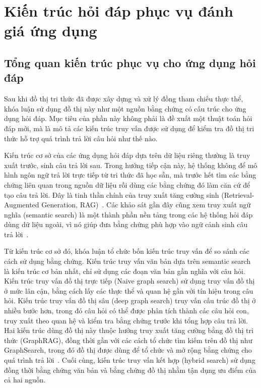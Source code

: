\section{Kiến trúc hỏi đáp phục vụ đánh giá ứng dụng}

\subsection{Tổng quan kiến trúc phục vụ cho ứng dụng hỏi đáp}

Sau khi đồ thị tri thức đã được xây dựng và xử lý đồng tham chiếu thực thể, khóa luận sử dụng đồ thị này như một nguồn bằng chứng có cấu trúc cho ứng dụng hỏi đáp. Mục tiêu của phần này không phải là đề xuất một thuật toán hỏi đáp mới, mà là mô tả các kiến trúc truy vấn được sử dụng để kiểm tra đồ thị tri thức hỗ trợ quá trình trả lời câu hỏi như thế nào.

Kiến trúc cơ sở của các ứng dụng hỏi đáp dựa trên dữ liệu riêng thường là truy xuất trước, sinh câu trả lời sau. Trong hướng tiếp cận này, hệ thống không để mô hình ngôn ngữ trả lời trực tiếp từ tri thức đã học sẵn, mà trước hết tìm các bằng chứng liên quan trong nguồn dữ liệu rồi dùng các bằng chứng đó làm căn cứ để tạo câu trả lời. Đây là tinh thần chính của truy xuất tăng cường sinh (Retrieval-Augmented Generation, RAG)~\cite{lewis2020retrieval}. Các khảo sát gần đây cũng xem truy xuất ngữ nghĩa (semantic search) là một thành phần nền tảng trong các hệ thống hỏi đáp dùng dữ liệu ngoài, vì nó giúp đưa bằng chứng phù hợp vào ngữ cảnh sinh câu trả lời~\cite{gao2023retrieval}.

Từ kiến trúc cơ sở đó, khóa luận tổ chức bốn kiến trúc truy vấn để so sánh các cách sử dụng bằng chứng. Kiến trúc truy vấn văn bản dựa trên semantic search là kiến trúc cơ bản nhất, chỉ sử dụng các đoạn văn bản gần nghĩa với câu hỏi. Kiến trúc truy vấn đồ thị trực tiếp (Naive graph search) sử dụng truy vấn đồ thị ở mức lân cận, bằng cách lấy các thực thể và quan hệ gần với tín hiệu trong câu hỏi. Kiến trúc truy vấn đồ thị sâu (deep graph search) truy vấn cấu trúc đồ thị ở nhiều bước hơn, trong đó câu hỏi có thể được phân tích thành các câu hỏi con, truy xuất theo quan hệ và kiểm tra bằng chứng trước khi tổng hợp câu trả lời. Hai kiến trúc dùng đồ thị này thuộc hướng truy xuất tăng cường bằng đồ thị tri thức (GraphRAG), đồng thời gần với các cách tổ chức tìm kiếm trên đồ thị như GraphSearch, trong đó đồ thị được dùng để tổ chức và mở rộng bằng chứng cho quá trình trả lời~\cite{edge2024local,yang2025graphsearch}. Cuối cùng, kiến trúc truy vấn kết hợp (hybrid search) sử dụng đồng thời bằng chứng văn bản và bằng chứng đồ thị nhằm tận dụng ưu điểm của cả hai nguồn.

